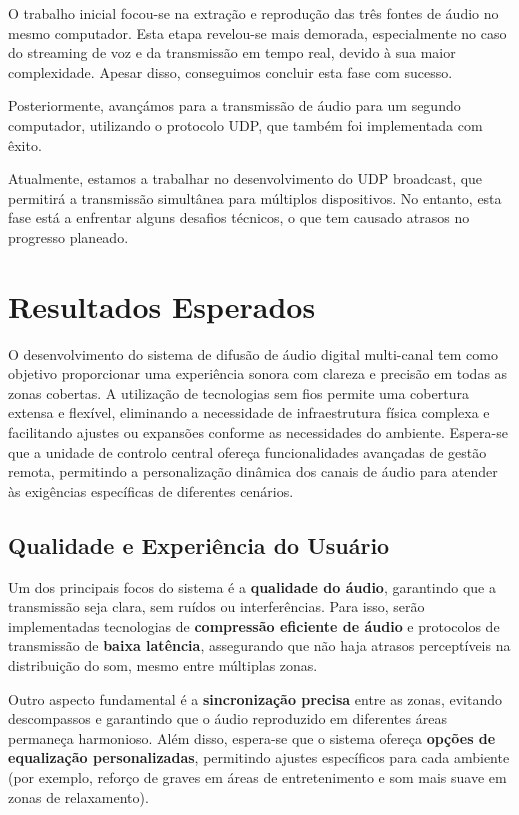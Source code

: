 \documentclass{article}
\begin{document}
O trabalho inicial focou-se na extração e reprodução das três fontes de áudio no mesmo computador. Esta etapa revelou-se mais demorada, especialmente no caso do streaming de voz e da transmissão em tempo real, devido à sua maior complexidade. Apesar disso, conseguimos concluir esta fase com sucesso.

Posteriormente, avançámos para a transmissão de áudio para um segundo computador, utilizando o protocolo UDP, que também foi implementada com êxito.

Atualmente, estamos a trabalhar no desenvolvimento do UDP broadcast, que permitirá a transmissão simultânea para múltiplos dispositivos. No entanto, esta fase está a enfrentar alguns desafios técnicos, o que tem causado atrasos no progresso planeado.

\clearpage
\newpage


\section{Resultados Esperados}

O desenvolvimento do sistema de difusão de áudio digital multi-canal tem como objetivo proporcionar uma experiência sonora com clareza e precisão em todas as zonas cobertas. A utilização de tecnologias sem fios permite uma cobertura extensa e flexível, eliminando a necessidade de infraestrutura física complexa e facilitando ajustes ou expansões conforme as necessidades do ambiente. Espera-se que a unidade de controlo central ofereça funcionalidades avançadas de gestão remota, permitindo a personalização dinâmica dos canais de áudio para atender às exigências específicas de diferentes cenários.

\hspace{2cm}

\subsection{Qualidade e Experiência do Usuário}
Um dos principais focos do sistema é a \textbf{qualidade do áudio}, garantindo que a transmissão seja clara, sem ruídos ou interferências. Para isso, serão implementadas tecnologias de \textbf{compressão eficiente de áudio} e protocolos de transmissão de \textbf{baixa latência}, assegurando que não haja atrasos perceptíveis na distribuição do som, mesmo entre múltiplas zonas.

Outro aspecto fundamental é a \textbf{sincronização precisa} entre as zonas, evitando descompassos e garantindo que o áudio reproduzido em diferentes áreas permaneça harmonioso. Além disso, espera-se que o sistema ofereça \textbf{opções de equalização personalizadas}, permitindo ajustes específicos para cada ambiente (por exemplo, reforço de graves em áreas de entretenimento e som mais suave em zonas de relaxamento).
\end{document}
